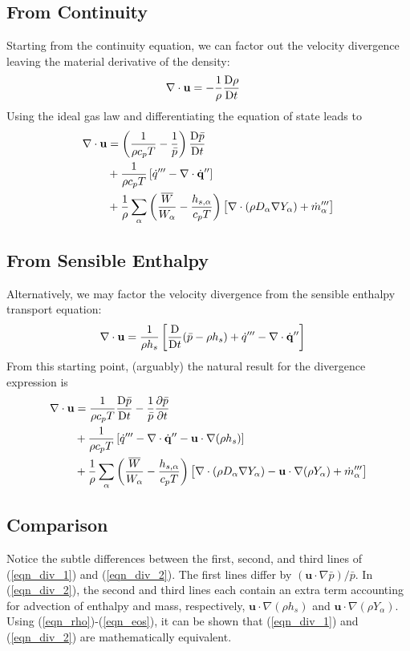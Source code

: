 \subsection{From Continuity}
Starting from the continuity equation, we can factor out the velocity divergence leaving the material derivative of the density:
\begin{align}
\nabla\cdot\mathbf{u} &= -\frac{1}{\rho}\frac{\mbox{D}\rho}{\mbox{D} t}
\end{align}
Using the ideal gas law and differentiating the equation of state leads to
\begin{align}
\label{eqn_div_1}
\nabla\cdot\mathbf{u} &= \left(\frac{1}{\rho c_p T} - \frac{1}{\bar{p}} \right)\frac{\mbox{D} \bar{p}}{\mbox{D} t} \notag\\
&+ \frac{1}{\rho c_p T} \left[ \dot{q}^{\prime\prime\prime} - \nabla\cdot \dot{\mathbf{q}}^{\prime\prime} \right] \notag\\
&+ \frac{1}{\rho} \sum_\alpha \left(\frac{\overline{W}}{W_\alpha} - \frac{h_{s,\alpha}}{c_p T} \right) \big[ \nabla\cdot (\rho D_\alpha
\nabla Y_\alpha) + \dot{m}_\alpha^{\prime\prime\prime} \big]
\end{align}

\subsection{From Sensible Enthalpy}
Alternatively, we may factor the velocity divergence from the sensible enthalpy transport equation:
\begin{align}
\label{eqn_div_new}
\nabla\cdot\mathbf{u} &= \frac{1}{\rho h_s} \left[ \frac{\mbox{D}}{\mbox{D} t}(\bar{p}-\rho h_s) + \dot{q}^{\prime\prime\prime} - \nabla\cdot \dot{\mathbf{q}}^{\prime\prime}
\right]
\end{align}
From this starting point, (arguably) the natural result for the divergence expression is
\begin{align}
\label{eqn_div_2}
\nabla\cdot\mathbf{u} &= \frac{1}{\rho c_p T}\frac{\mbox{D} \bar{p}}{\mbox{D} t} - \frac{1}{\bar{p}} \frac{\partial \bar{p}}{\partial t}
\notag\\
&+ \frac{1}{\rho c_p T}\left[ \dot{q}^{\prime\prime\prime} - \nabla\cdot \dot{\mathbf{q}}^{\prime\prime} - \mathbf{u} \cdot\nabla (\rho h_s) \right]
\notag\\
&+ \frac{1}{\rho} \sum_\alpha \left(\frac{\overline{W}}{W_\alpha} - \frac{h_{s,\alpha}}{c_p T} \right) \big[ \nabla\cdot (\rho D_\alpha
\nabla Y_\alpha) - \mathbf{u} \cdot \nabla (\rho Y_\alpha) + \dot{m}_\alpha^{\prime\prime\prime} \big]
\end{align}

\subsection{Comparison}
Notice the subtle differences between the first, second, and third lines of (\ref{eqn_div_1}) and (\ref{eqn_div_2}).  The first
lines differ by $\displaystyle (\mathbf{u}\cdot\nabla \bar{p})/\bar{p}$. In (\ref{eqn_div_2}), the second and third lines each
contain an extra term accounting for advection of enthalpy and mass, respectively, $\mathbf{u} \cdot\nabla (\rho h_s)$ and
$\mathbf{u} \cdot \nabla (\rho Y_\alpha)$.  Using (\ref{eqn_rho})-(\ref{eqn_eos}), it can be shown that (\ref{eqn_div_1}) and
(\ref{eqn_div_2}) are mathematically equivalent.

